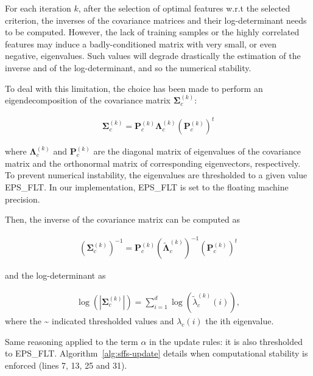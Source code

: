 \documentclass[journal,peerreview,onecolumn]{IEEEtran}
\begin{document}
    For each  iteration $k$, after  the selection of  optimal features
    w.r.t  the  selected criterion,  the  inverses  of the  covariance
    matrices and their log-determinant  needs to be computed. However,
    the lack of training samples or the highly correlated features may
    induce  a  badly-conditioned  matrix  with  very  small,  or  even
    negative, eigenvalues.   Such values will degrade  drastically the
    estimation of the  inverse and of the log-determinant,  and so the
    numerical stability.

    To deal with this limitation, the choice has been made to perform an eigendecomposition of the covariance matrix $\boldsymbol{\Sigma}^{(k)}_c$:

    \begin{eqnarray}
    \boldsymbol{\Sigma}^{(k)}_c = \mathbf{P}^{(k)}_c \boldsymbol{\Lambda}^{(k)}_c (\mathbf{P}^{(k)}_c)^t\label{eq:eigendecomp}
    \end{eqnarray}


    where $\boldsymbol{\Lambda}^{(k)}_c$  and $\mathbf{P}^{(k)}_c$ are
    the diagonal  matrix of eigenvalues  of the covariance  matrix and
    the    orthonormal   matrix    of   corresponding    eigenvectors,
    respectively.  To prevent  numerical instability,  the eigenvalues
    are thresholded to a given  value EPS\_FLT. In our implementation,
    EPS\_FLT is set to the floating machine precision.

    Then, the inverse of the covariance matrix can be computed as

    \begin{eqnarray}
      (\boldsymbol{\Sigma}^{(k)}_c)^{-1} = \mathbf{P}^{(k)}_c (\tilde{\boldsymbol{\Lambda}}^{(k)}_c)^{-1} (\mathbf{P}^{(k)}_c)^t\label{eq:eigendecomp:inv}
    \end{eqnarray}

    and the log-determinant as

    \begin{eqnarray}
      \label{eq:log:det}
      \log \left(|\boldsymbol{\Sigma}_c^{(k)}|\right) = \sum_{i=1}^d\log(\tilde{\lambda}_{c}^{(k)}(i)),
    \end{eqnarray}
    where the \textasciitilde{} indicated thresholded values and $\lambda_{c}(i)$ the ith eigenvalue.

    Same reasoning applied  to the term $\alpha$ in  the update rules:
    it       is       also        thresholded       to       EPS\_FLT.
    Algorithm~\ref{alg:sffs-update}    details   when    computational
    stability is enforced (lines 7, 13, 25 and 31).
\end{document}
